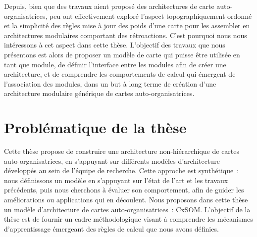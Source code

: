 Depuis, bien que des travaux aient proposé des architectures de carte auto-organisatrices, peu ont effectivement exploré l'aspect topographiquement ordonné et la simplicité des règles mise à jour des poids d'une carte pour les assembler en architectures modulaires comportant des rétroactions. 
C'est pourquoi nous nous intéressons à cet aspect dans cette thèse.
L'objectif des travaux que nous présentons est alors de proposer un modèle de carte qui puisse être utilisée en tant que module, de définir l'interface entre les modules afin de créer une architecture, et de comprendre les comportements de calcul qui émergent de l'association des modules, dans un but à long terme de création d'une architecture modulaire générique de cartes auto-organisatrices.



\section*{Problématique de la thèse}

Cette thèse propose de construire une architecture non-hiérarchique de cartes auto-organisatrices, en s'appuyant sur différents modèles d'architecture développés au sein de l'équipe de recherche.
Cette approche est synthétique~: nous définissons un modèle en s'appuyant sur l'état de l'art et les travaux précédents, puis nous cherchons à évaluer son comportement, afin de guider les améliorations ou applications qui en découlent. Nous proposons dans cette thèse un modèle d'architecture de cartes auto-organisatrices~: CxSOM.
L'objectif de la thèse est de fournir un cadre méthodologique visant à comprendre les mécanismes d'apprentissage émergeant des règles de calcul que nous avons définies.

